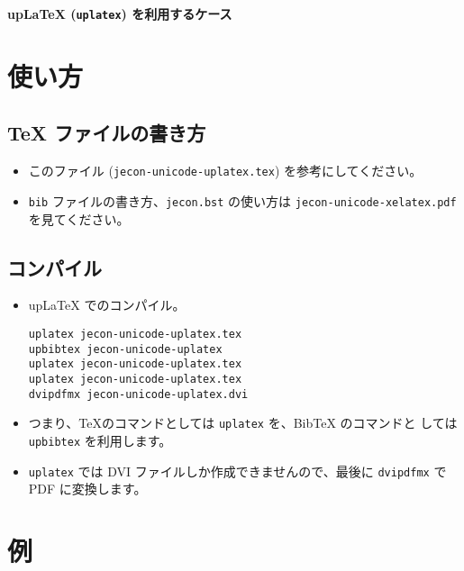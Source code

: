 \documentclass[a4j,10pt]{ujarticle}
\begin{document}

\begin{flushleft}
 {\Large \textbf{upLaTeX (\texttt{uplatex}) を利用するケース}}
\end{flushleft}

\vspace{1em}


\section{使い方}

\subsection{TeX ファイルの書き方}

\begin{itemize}
 \item このファイル (\texttt{jecon-unicode-uplatex.tex}) を参考にしてください。
 \item \texttt{bib} ファイルの書き方、\texttt{jecon.bst} の使い方は
       \texttt{jecon-unicode-xelatex.pdf} を見てください。
\end{itemize}

\subsection{コンパイル}

\begin{itemize}
 \item upLaTeX でのコンパイル。
\begin{verbatim}
uplatex jecon-unicode-uplatex.tex
upbibtex jecon-unicode-uplatex
uplatex jecon-unicode-uplatex.tex               
uplatex jecon-unicode-uplatex.tex
dvipdfmx jecon-unicode-uplatex.dvi
\end{verbatim}
 \item つまり、\TeX のコマンドとしては \texttt{uplatex} を、BibTeX のコマンドと
       しては \texttt{upbibtex} を利用します。
 \item \texttt{uplatex} では DVI ファイルしか作成できませんので、最後に
       \texttt{dvipdfmx} で PDF に変換します。
\end{itemize}

\section{例}



\nocite{*}



%

\end{document}
